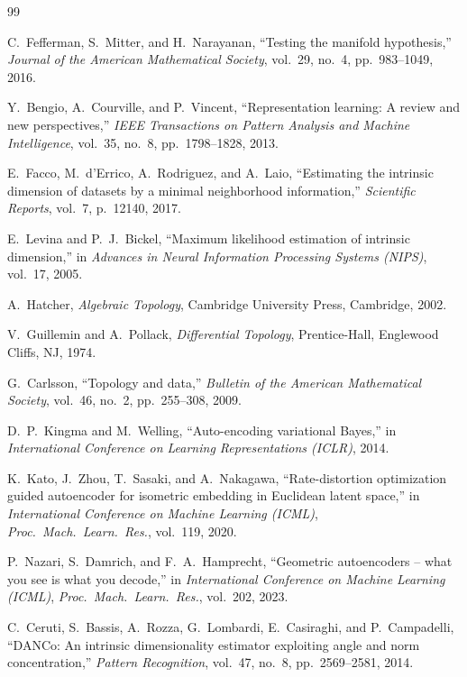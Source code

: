 \documentclass[11pt,a4paper]{jsarticle}
\begin{document}
\begin{thebibliography}{99}

C.~Fefferman, S.~Mitter, and H.~Narayanan,
``Testing the manifold hypothesis,''
\textit{Journal of the American Mathematical Society}, vol.~29, no.~4,
pp.~983--1049, 2016.

Y.~Bengio, A.~Courville, and P.~Vincent,
``Representation learning: A review and new perspectives,''
\textit{IEEE Transactions on Pattern Analysis and Machine Intelligence},
vol.~35, no.~8, pp.~1798--1828, 2013.

E.~Facco, M.~d'Errico, A.~Rodriguez, and A.~Laio,
``Estimating the intrinsic dimension of datasets by a minimal neighborhood information,''
\textit{Scientific Reports}, vol.~7, p.~12140, 2017.

E.~Levina and P.~J.~Bickel,
``Maximum likelihood estimation of intrinsic dimension,''
in \textit{Advances in Neural Information Processing Systems (NIPS)}, vol.~17, 2005.

A.~Hatcher,
\textit{Algebraic Topology},
Cambridge University Press, Cambridge, 2002.

V.~Guillemin and A.~Pollack,
\textit{Differential Topology},
Prentice-Hall, Englewood Cliffs, NJ, 1974.

G.~Carlsson,
``Topology and data,''
\textit{Bulletin of the American Mathematical Society},
vol.~46, no.~2, pp.~255--308, 2009.

D.~P.~Kingma and M.~Welling,
``Auto-encoding variational Bayes,''
in \textit{International Conference on Learning Representations (ICLR)}, 2014.

K.~Kato, J.~Zhou, T.~Sasaki, and A.~Nakagawa,
``Rate-distortion optimization guided autoencoder for isometric embedding
in Euclidean latent space,''
in \textit{International Conference on Machine Learning (ICML)},
\textit{Proc.~Mach.~Learn.~Res.}, vol.~119, 2020.

P.~Nazari, S.~Damrich, and F.~A.~Hamprecht,
``Geometric autoencoders -- what you see is what you decode,''
in \textit{International Conference on Machine Learning (ICML)},
\textit{Proc.~Mach.~Learn.~Res.}, vol.~202, 2023.

C.~Ceruti, S.~Bassis, A.~Rozza, G.~Lombardi, E.~Casiraghi, and P.~Campadelli,
``DANCo: An intrinsic dimensionality estimator exploiting angle and norm concentration,''
\textit{Pattern Recognition}, vol.~47, no.~8, pp.~2569--2581, 2014.


\end{thebibliography}
\end{document}
